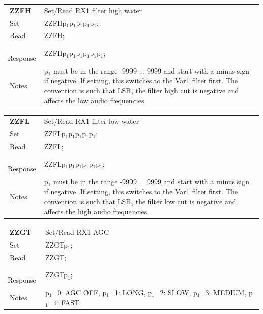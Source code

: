 \documentclass[12pt]{book}
\begin{document}
\begin{center}
\begin{tabular}{|p{2cm}|p{11cm}|}
\toprule
$\phantom{\Big|}$\textbf{\large ZZFH} & Set/Read RX1 filter high water \\\cline{1-2}
$\phantom{\Big|}${\large Set} & {ZZFHp$_1$p$_1$p$_1$p$_1$p$_1$;} \\\hline
$\phantom{\Big|}${\large Read} & {ZZFH;} \\\hline
$\phantom{\Big|}${\large Response} & {ZZFHp$_1$p$_1$p$_1$p$_1$p$_1$p$_1$;} \\\hline
$\phantom{\Big|}${\large Notes} & \multicolumn{1}{|p{11cm}|}{p$_1$ must be in the range -9999 ... 9999 and start with a minus sign if negative. If setting, this switches to the Var1 filter first. The convention is such that LSB, the filter high cut is negative and affects the low audio frequencies.} \\
\bottomrule
\end{tabular}
\end{center}

\begin{center}
\begin{tabular}{|p{2cm}|p{11cm}|}
\toprule
$\phantom{\Big|}$\textbf{\large ZZFL} & Set/Read RX1 filter low water \\\cline{1-2}
$\phantom{\Big|}${\large Set} & {ZZFLp$_1$p$_1$p$_1$p$_1$p$_1$;} \\\hline
$\phantom{\Big|}${\large Read} & {ZZFL;} \\\hline
$\phantom{\Big|}${\large Response} & {ZZFLp$_1$p$_1$p$_1$p$_1$p$_1$p$_1$;} \\\hline
$\phantom{\Big|}${\large Notes} & \multicolumn{1}{|p{11cm}|}{p$_1$ must be in the range -9999 ... 9999 and start with a minus sign if negative. If setting, this switches to the Var1 filter first. The convention is such that LSB, the filter low cut is negative and affects the high audio frequencies.} \\
\bottomrule
\end{tabular}
\end{center}

\begin{center}
\begin{tabular}{|p{2cm}|p{11cm}|}
\toprule
$\phantom{\Big|}$\textbf{\large ZZGT} & Set/Read RX1 AGC \\\cline{1-2}
$\phantom{\Big|}${\large Set} & {ZZGTp$_1$;} \\\hline
$\phantom{\Big|}${\large Read} & {ZZGT;} \\\hline
$\phantom{\Big|}${\large Response} & {ZZGTp$_1$;} \\\hline
$\phantom{\Big|}${\large Notes} & \multicolumn{1}{|p{11cm}|}{p$_1$=0: AGC OFF, p$_1$=1: LONG, p$_1$=2: SLOW, p$_1$=3: MEDIUM, p$_1$=4: FAST} \\
\bottomrule
\end{tabular}
\end{center}
\end{document}
